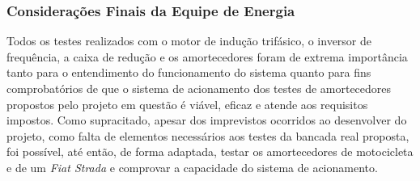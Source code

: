 \subsubsection{Considerações Finais da Equipe de Energia}

	Todos os testes realizados com o motor de indução trifásico, o inversor de frequência, a caixa de redução e os amortecedores foram de extrema importância tanto para o entendimento do funcionamento do sistema quanto para fins comprobatórios de que o sistema de acionamento dos testes de amortecedores propostos pelo projeto em questão é viável, eficaz e atende aos requisitos impostos. Como supracitado, apesar dos imprevistos ocorridos ao desenvolver do projeto, como falta de elementos necessários aos testes da bancada real proposta, foi possível, até então, de forma adaptada, testar os amortecedores de motocicleta e de um \textit{Fiat Strada} e comprovar a capacidade do sistema de acionamento.
	

